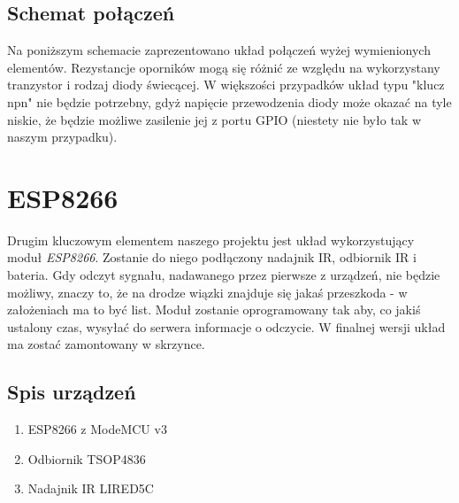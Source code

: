\subsection{Schemat połączeń}

Na poniższym schemacie zaprezentowano układ połączeń wyżej wymienionych elementów. Rezystancje oporników mogą się różnić ze względu na wykorzystany tranzystor i rodzaj diody świecącej. W większości przypadków układ typu "klucz npn" nie będzie potrzebny, gdyż napięcie przewodzenia diody może okazać na tyle niskie, że będzie możliwe zasilenie jej z portu GPIO (niestety nie było tak w naszym przypadku).

\begin{center}
\end{center}


\section{ESP8266}

Drugim kluczowym elementem naszego projektu jest układ wykorzystujący moduł \emph{ESP8266}. Zostanie do niego podłączony nadajnik IR, odbiornik IR i bateria. Gdy odczyt sygnału, nadawanego przez pierwsze z urządzeń, nie będzie możliwy, znaczy to, że na drodze wiązki znajduje się jakaś przeszkoda - w założeniach ma to być list. Moduł zostanie oprogramowany tak aby, co jakiś ustalony czas, wysyłać do serwera informacje o odczycie. W finalnej wersji układ ma zostać zamontowany w skrzynce.
\subsection{Spis urządzeń}

\begin{enumerate}
	\item ESP8266 z ModeMCU v3 \\
	\begin{center}
	\end{center}
	\item Odbiornik TSOP4836 \\
	\begin{center}
	\end{center}
	\item Nadajnik IR LIRED5C \\
	\begin{center}
	\end{center}
\end{enumerate}

